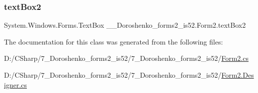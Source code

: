 \subsubsection{\texorpdfstring{text\+Box2}{textBox2}}
{\footnotesize\ttfamily System.\+Windows.\+Forms.\+Text\+Box \+\_\+\_\+\+Doroshenko\+\_\+forms2\+\_\+is52.\+Form2.\+text\+Box2\hspace{0.3cm}{\ttfamily [package]}}



The documentation for this class was generated from the following files\+:\begin{DoxyCompactItemize}
\item 
D\+:/\+C\+Sharp/7\+\_\+\+Doroshenko\+\_\+forms2\+\_\+is52/7\+\_\+\+Doroshenko\+\_\+forms2\+\_\+is52/\hyperlink{_form2_8cs}{Form2.\+cs}\item 
D\+:/\+C\+Sharp/7\+\_\+\+Doroshenko\+\_\+forms2\+\_\+is52/7\+\_\+\+Doroshenko\+\_\+forms2\+\_\+is52/\hyperlink{_form2_8_designer_8cs}{Form2.\+Designer.\+cs}\end{DoxyCompactItemize}
